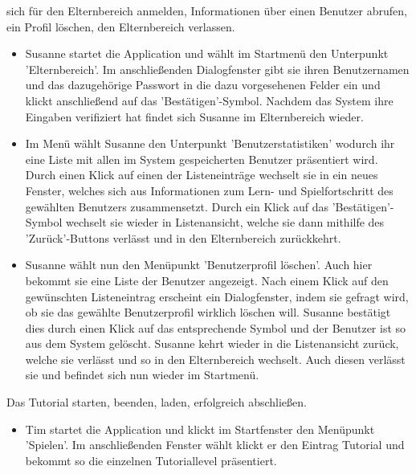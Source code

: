 \begin{requirements}
\begin{itemize}
	\end{itemize}
	
  	
  	 sich für den Elternbereich anmelden, Informationen über einen Benutzer abrufen, ein Profil löschen, den Elternbereich verlassen.
  	
  	\begin{itemize}
  	
		    \item Susanne startet die Application und wählt im Startmenü den Unterpunkt 'Elternbereich'. Im anschließenden Dialogfenster gibt sie ihren Benutzernamen und das dazugehörige Passwort in die dazu vorgesehenen Felder ein und klickt anschließend auf das 'Bestätigen'-Symbol. Nachdem das System ihre Eingaben verifiziert hat findet sich Susanne im Elternbereich wieder.
		
		    \item Im Menü wählt Susanne den Unterpunkt 'Benutzerstatistiken' wodurch ihr eine Liste mit allen im System gespeicherten Benutzer präsentiert  wird. Durch einen Klick auf einen der Listeneinträge wechselt sie in ein neues Fenster, welches sich aus Informationen zum Lern- und Spielfortschritt des gewählten Benutzers zusammensetzt. Durch ein Klick auf das 'Bestätigen'-Symbol wechselt sie wieder in Listenansicht, welche sie dann mithilfe des 'Zurück'-Buttons verlässt und in den Elternbereich zurückkehrt.
		
		    \item Susanne wählt nun den Menüpunkt 'Benutzerprofil löschen'. Auch hier bekommt sie eine Liste der Benutzer angezeigt. Nach einem Klick auf den gewünschten Listeneintrag erscheint ein Dialogfenster, indem sie gefragt wird, ob sie das gewählte Benutzerprofil wirklich löschen will. Susanne bestätigt dies durch einen Klick auf das entsprechende Symbol und der Benutzer ist so aus dem System gelöscht. Susanne kehrt wieder in die Listenansicht zurück, welche sie verlässt und so in den Elternbereich wechselt. Auch diesen verlässt sie und befindet sich nun wieder im Startmenü.
  	
  	\end{itemize}
  	
  	
  	 Das Tutorial starten, beenden, laden, erfolgreich abschließen.
  	
  	\begin{itemize}

	      \item Tim startet die Application und klickt im Startfenster den Menüpunkt 'Spielen'. Im anschließenden Fenster wählt klickt er den Eintrag Tutorial und bekommt so die einzelnen Tutoriallevel präsentiert.
  	
  	\end{itemize}
 
  		
\end{requirements}
  		
